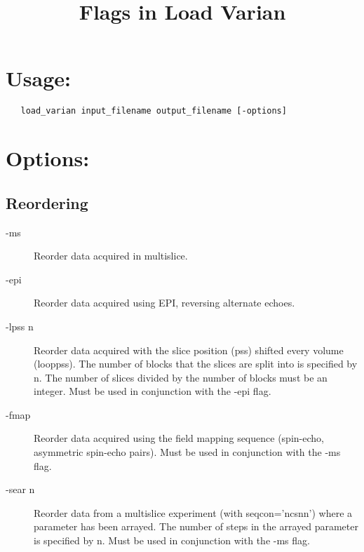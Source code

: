 \documentclass[12pt, a4paper]{article}
\title{Flags in Load Varian}
\author{}
\date{}
\begin{document}
\maketitle

\section*{Usage:}
\begin{verbatim}
   load_varian input_filename output_filename [-options]
\end{verbatim}

\section*{Options:}

\subsection*{Reordering}
\begin{description}
\item[-ms] Reorder data acquired in multislice.
\item[-epi] Reorder data acquired using EPI, reversing alternate
  echoes.
\item[-lpss n] Reorder data acquired with the slice position (pss)
  shifted every volume (looppss).  The number of blocks that the
  slices are split into is specified by n.  The number of slices
  divided by the number of blocks must be an integer.  Must be used in
  conjunction with the -epi flag.
\item[-fmap] Reorder data acquired using the field mapping sequence
  (spin-echo, asymmetric spin-echo pairs). Must be used in
  conjunction with the -ms flag.
\item[-sear n] Reorder data from a multislice experiment (with
  seqcon='ncsnn') where a parameter has been arrayed.  The number of
  steps in the arrayed parameter is specified by n. Must be used in
  conjunction with the -ms flag.
\end{description}
\end{document}
